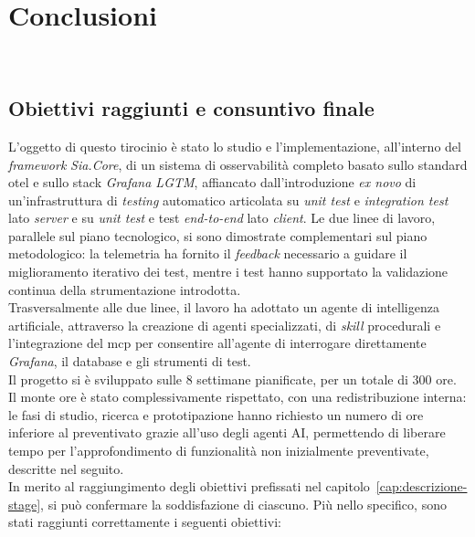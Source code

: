 \chapter{Conclusioni}
\label{cap:conclusioni}

\\

\section{Obiettivi raggiunti e consuntivo finale}

L'oggetto di questo tirocinio è stato lo studio e l'implementazione, all'interno
del \emph{framework} \emph{Sia.Core}, di un sistema di osservabilità completo
basato sullo standard \gls{otel} e sullo stack \emph{Grafana LGTM}, affiancato
dall'introduzione \emph{ex novo} di un'infrastruttura di \emph{testing}
automatico articolata su \emph{unit test} e \emph{integration test} lato
\emph{server} e su \emph{unit test} e test \emph{end-to-end} lato \emph{client}.
Le due linee di lavoro, parallele sul piano tecnologico, si sono dimostrate
complementari sul piano metodologico: la telemetria ha fornito il \emph{feedback}
necessario a guidare il miglioramento iterativo dei test, mentre i test hanno
supportato la validazione continua della strumentazione introdotta.\\
Trasversalmente alle due linee, il lavoro ha adottato un agente di intelligenza
artificiale, attraverso la creazione di
agenti specializzati, di \emph{skill} procedurali e l'integrazione del
\gls{mcp} per consentire all'agente di interrogare direttamente \emph{Grafana},
il database e gli strumenti di test.\\
Il progetto si è sviluppato sulle 8 settimane pianificate, per un totale di 300
ore. Il monte ore è stato complessivamente rispettato, con una redistribuzione
interna: le fasi di studio, ricerca e prototipazione
hanno richiesto un numero di ore inferiore al preventivato grazie all'uso
degli agenti AI, permettendo di liberare tempo per
l'approfondimento di funzionalità non inizialmente preventivate, descritte nel
seguito.\\
In merito al raggiungimento degli obiettivi prefissati nel
capitolo~\ref{cap:descrizione-stage}, si può confermare la soddisfazione di
ciascuno. Più nello specifico, sono stati raggiunti correttamente i seguenti
obiettivi:

